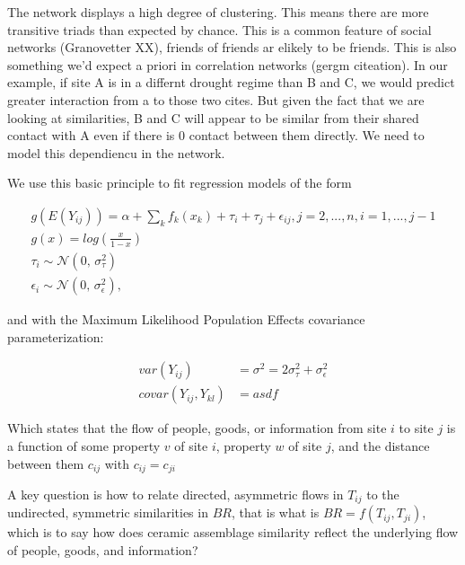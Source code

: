 \documentclass[fleqn,10pt]{wlscirep}
\begin{document}
The network displays a high degree of clustering. This means there are more transitive triads than expected by chance. This is a common feature of social networks (Granovetter XX), friends of friends ar elikely to be friends. This is also something we'd expect a priori in correlation networks (gergm citeation). In our example, if site A is in a differnt drought regime than B and C, we would predict greater interaction from a to those two cites. But given the fact that we are looking at similarities, B and C will appear to be similar from their shared contact with A even if there is 0 contact between them directly. We need to model this dependiencu in the network.

We use this basic principle to fit regression models of the form

\begin{equation}
\begin{split}
    g(E(Y_{ij})) = \alpha + \sum_k f_k(x_k) + \tau_i + \tau_j + \epsilon_{ij}, j = 2, ..., n, i = 1, ..., j - 1\\
    g(x) = log(\frac{x}{1-x})\\
    \tau_i \sim \mathcal{N}(0,\,\sigma^{2}_{\tau})\\
    \epsilon_i \sim \mathcal{N}(0,\,\sigma^{2}_{\epsilon}),
\end{split}
\end{equation}

and with the Maximum Likelihood Population Effects covariance parameterization:

\begin{gather}
    var(Y_{ij}) &= \sigma^2 = 2\sigma^{2}_{\tau} + \sigma^{2}_{\epsilon}\\
    covar(Y_{ij}, Y_{kl}) &=  asdf
\end{gather}

Which states that the flow of people, goods, or information from site $i$ to site $j$ is a function of some property $v$ of site $i$, property $w$ of site $j$, and the distance between them $c_{ij}$ with $c_{ij} = c_{ji}$

A key question is how to relate directed, asymmetric flows in $T_{ij}$ to the undirected, symmetric similarities in $BR$, that is what is $BR = f(T_{ij},T_{ji})$, which is to say how does ceramic assemblage similarity reflect the underlying flow of people, goods, and information?
\end{document}
